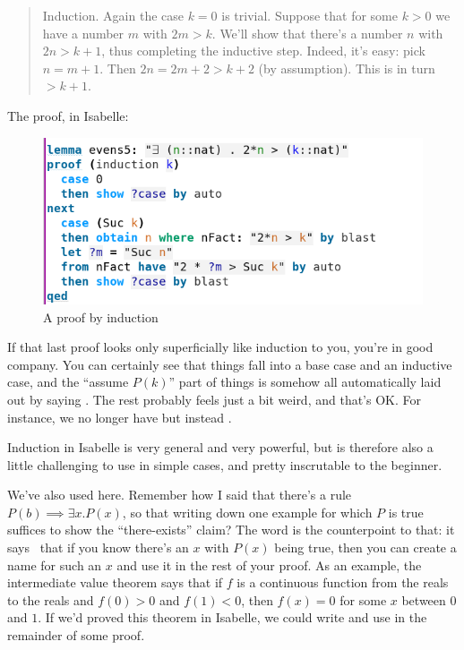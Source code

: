 \begin{quotation}    
Induction. Again the case $k = 0$ is trivial. Suppose that for some $k > 0$ we have a number $m$ with $2m > k$. We'll show that there's a number $n$ with $2n > k+1$, thus completing the inductive step. Indeed, it's easy: pick $n = m + 1$. Then $2n = 2m + 2  > k + 2$ (by assumption). This is in turn $> k + 1.$ 
\end{quotation}

The proof, in Isabelle:

\begin{figure}[H]
    \centering
    \includegraphics[width=0.75\linewidth]{TEXT/C01/Images/proof3.png}
    \caption{A proof by induction}
\end{figure}


If that last proof looks only superficially like induction to you, you're in good company. You can certainly see that things fall into a base case and an inductive case, and the ``assume $P(k)$'' part of things is somehow all automatically laid out by saying . The rest probably feels just a bit weird, and that's OK. For instance, we no longer have  but instead . 

Induction in Isabelle is very general and very powerful, but is therefore also a little challenging to use in simple cases, and pretty inscrutable to the beginner.

We've also used  here. Remember how I said that there's a rule $P(b) \implies \exists x . P(x)$, so that writing down one example for which $P$ is true suffices to show the ``there-exists'' claim? The word  is the counterpoint to that: it says  that if you know there's an $x$ with $P(x)$ being true, then you can create a name for such an $x$ and use it in the rest of your proof. As an example, the intermediate value theorem says that if $f$ is a continuous function from the reals to the reals and $f(0) > 0$ and $f(1) < 0$, then $f(x) = 0$ for some $x$ between $0$ and $1$. If we'd proved this theorem in Isabelle, we could write  and use  in the remainder of some proof.  

